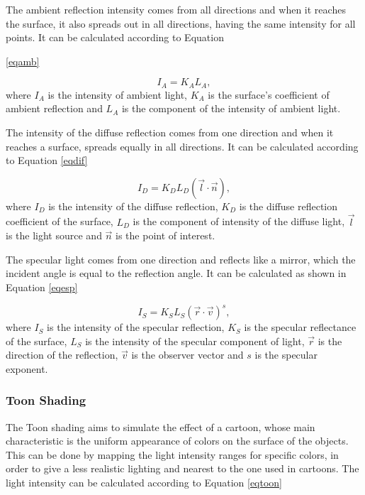 \documentclass[10pt, conference, compsocconf]{IEEEtran}
\begin{document}
The ambient reflection intensity comes from all directions and when it reaches the surface, it also spreads out in all directions, having the same intensity for all points. It can be calculated according to Equation {\ref{eqamb}

	\begin{equation}
		I_ {A} = K_ {A}L_ {A} ,
	\label{eqamb}
	\end{equation}
	where  $I_A$ is the intensity of ambient light, $K_ {A}$ is the surface's coefficient of ambient reflection and $L_ {A}$ is the component of the intensity of ambient light.

The intensity of the diffuse reflection comes from one direction and when it reaches a surface, spreads equally in all directions. It can be calculated according to Equation \ref{eqdif}

	\begin{equation}
		I_ {D} = K_ {D}L_ {D}( \vec{ l} \cdot \vec{ n}), 
	\label{eqdif}
	\end{equation}
	 where $I_D$ is the intensity of the diffuse reflection, $K_ {D}$ is the diffuse reflection coefficient of the surface, $L_ {D}$ is the component of intensity of the diffuse light, $\vec{ l}$ is the light source and $\vec{ n}$ is the point of interest.

The specular light comes from one direction and reflects like a mirror, which the incident angle is equal to the reflection angle. It can be calculated as shown in Equation \ref{eqesp}

	\begin{equation}
		I_ {S} =K_ {S}L_ {S} (\vec{ r} \cdot \vec{ v})^s,
	\label{eqesp}
	\end{equation}
	where $ I_S$ is the intensity of the specular reflection, $ K_ {S} $ is the specular reflectance of the surface, $ L_ {S} $ is the intensity of the specular component of light, $\vec{ r}$ is the direction of the reflection, $\vec{ v}$  is the observer vector and $ s $ is the specular exponent.

\subsubsection{Toon Shading}
\label{toon}

 The Toon shading aims to simulate the effect of a cartoon, whose main characteristic is the uniform appearance of colors on the surface of the objects.
This can be done by mapping the light intensity ranges for specific colors, in order to give a less realistic lighting and nearest to the one used in cartoons.
The light intensity can be calculated according to Equation \ref{eqtoon}

}
\end{document}
